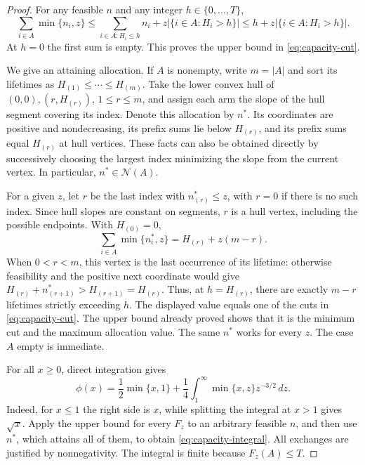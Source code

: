 \begin{proof}
For any feasible $n$ and any integer $h\in\{0,\ldots,T\}$,
\[
 \sum_{i\in A}\min\{n_i,z\}
 \le\sum_{i\in A:H_i\le h}n_i
      +z|\{i\in A:H_i>h\}|
 \le h+z|\{i\in A:H_i>h\}|.
\]
At $h=0$ the first sum is empty. This proves the upper bound in
\eqref{eq:capacity-cut}.

We give an attaining allocation. If $A$ is nonempty, write $m=|A|$ and
sort its lifetimes as $H_{(1)}\le\cdots\le H_{(m)}$. Take the lower
convex hull of $(0,0),(r,H_{(r)})$, $1\le r\le m$, and assign each arm
the slope of the hull segment covering its index. Denote this allocation
by $n^*$. Its coordinates are positive and nondecreasing, its prefix
sums lie below $H_{(r)}$, and its prefix sums equal $H_{(r)}$ at hull
vertices. These facts can also be obtained directly by successively
choosing the largest index minimizing the slope from the current
vertex. In particular, $n^*\in\mathcal N(A)$.

For a given $z$, let $r$ be the last index with $n^*_{(r)}\le z$, with
$r=0$ if there is no such index. Since hull slopes are constant on
segments, $r$ is a hull vertex, including the possible endpoints.
With $H_{(0)}=0$,
\[
 \sum_{i\in A}\min\{n_i^*,z\}=H_{(r)}+z(m-r).
\]
When $0<r<m$, this vertex is the last occurrence of its lifetime:
otherwise feasibility and the positive next coordinate would give
$H_{(r)}+n^*_{(r+1)}>H_{(r+1)}=H_{(r)}$. Thus, at $h=H_{(r)}$, there
are exactly $m-r$ lifetimes strictly exceeding $h$. The displayed value
equals one of the cuts in \eqref{eq:capacity-cut}. The upper bound
already proved shows that it is the minimum cut and the maximum
allocation value. The same $n^*$ works for every $z$. The case $A$ empty
is immediate.

For all $x\ge0$, direct integration gives
\[
 \phi(x)=\frac12\min\{x,1\}
       +\frac14\int_1^\infty\min\{x,z\}z^{-3/2}\,dz.
\]
Indeed, for $x\le1$ the right side is $x$, while splitting the integral
at $x>1$ gives $\sqrt{x}$. Apply the upper bound for every $F_z$ to an
arbitrary feasible $n$, and then use $n^*$, which attains all of them,
to obtain \eqref{eq:capacity-integral}. All exchanges are justified by
nonnegativity. The integral is finite because $F_z(A)\le T$.


\end{proof}
